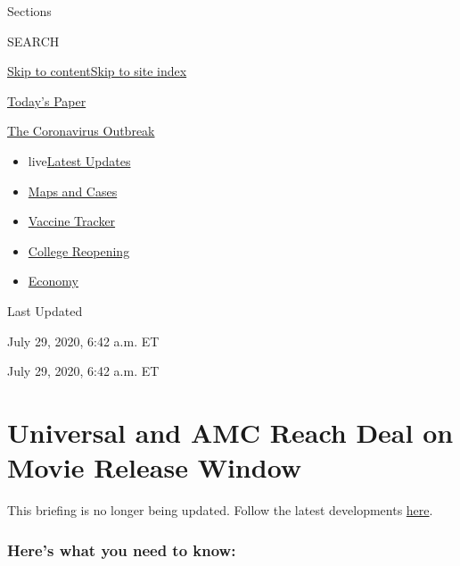 Sections

SEARCH

\protect\hyperlink{site-content}{Skip to
content}\protect\hyperlink{site-index}{Skip to site index}

\href{https://myaccount.nytimes.com/auth/login?response_type=cookie\&client_id=vi}{}

\href{https://www.nytimes.com/section/todayspaper}{Today's Paper}

\href{https://www.nytimes.com/news-event/coronavirus}{The Coronavirus
Outbreak}

\begin{itemize}
\tightlist
\item
  live\href{https://www.nytimes.com/2020/08/04/world/coronavirus-covid-19.html}{Latest
  Updates}
\item
  \href{https://www.nytimes.com/interactive/2020/us/coronavirus-us-cases.html}{Maps
  and Cases}
\item
  \href{https://www.nytimes.com/interactive/2020/science/coronavirus-vaccine-tracker.html}{Vaccine
  Tracker}
\item
  \href{https://www.nytimes.com/2020/08/02/us/covid-college-reopening.html}{College
  Reopening}
\item
  \href{https://www.nytimes.com/live/2020/08/03/business/stock-market-today-coronavirus}{Economy}
\end{itemize}

Last Updated

July 29, 2020, 6:42 a.m. ET

July 29, 2020, 6:42 a.m. ET

\hypertarget{universal-and-amc-reach-deal-on-movie-release-window}{%
\section{Universal and AMC Reach Deal on Movie Release
Window}\label{universal-and-amc-reach-deal-on-movie-release-window}}

This briefing is no longer being updated. Follow the latest developments
\href{https://www.nytimes.com/live/2020/07/29/business/stock-market-today-coronavirus}{here}.

\hypertarget{heres-what-you-need-to-know}{%
\subsubsection{Here's what you need to
know:}\label{heres-what-you-need-to-know}}

